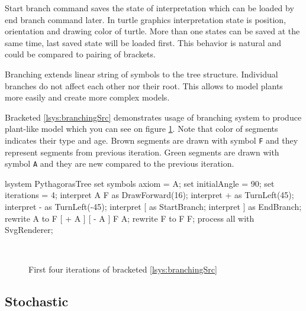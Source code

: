 Start branch command saves the state of interpretation which can be loaded by end branch command later.
In turtle graphics interpretation state is position, orientation and drawing color of turtle.
More than one states can be saved at the same time, last saved state will be loaded first.
This behavior is natural and could be compared to pairing of brackets.

Branching extends linear string of symbols to the tree structure.
Individual branches do not affect each other nor their root.
This allows to model plants more easily and create more complex models.

Bracketed \lsystem \ref{lsys:branchingSrc} demonstrates usage of branching system to produce plant-like model which you can see on figure \ref{fig:branching}.
Note that color of segments indicates their type and age.
Brown segments are drawn with symbol \texttt{F} and they represent segments from previous iteration.
Green segments are drawn with symbol \texttt{A} and they are new compared to the previous iteration.

\begin{Lsystem}[label=lsys:branchingSrc,caption={Bracketed \lsystem which creates plant-like model on fig. \ref{fig:branching}}]
lsystem PythagorasTree {
	set symbols axiom = A;
	set initialAngle = 90;
	set iterations = 4;	
	interpret A F as DrawForward(16);
	interpret + as TurnLeft(45);
	interpret - as TurnLeft(-45);
	interpret [ as StartBranch;
	interpret ] as EndBranch;
	rewrite A to F [ + A ] [ - A ] F A;
	rewrite F to F F;
}
process all with SvgRenderer;
\end{Lsystem}

\begin{figure}[ht]
	\centering
	 ~
	 ~
	 ~
	\caption{First four iterations of bracketed \lsystem \ref{lsys:branchingSrc}}
	\label{fig:branching}
\end{figure}



\subsection{Stochastic \lsystems}

\newcommand{\zerolsystem}{\mbox{0L-system}\xspace}
\newcommand{\zerolsystems}{\mbox{0L-systems}\xspace}

